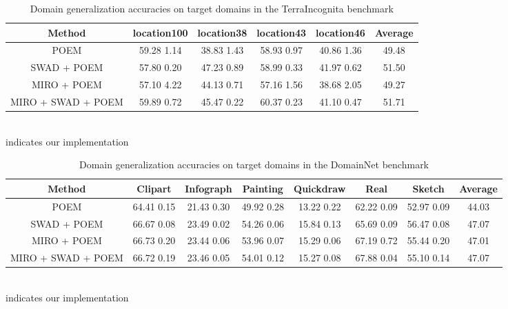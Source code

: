 \documentclass[letterpaper]{article} \usepackage{aaai23}  \usepackage{times}  \usepackage{helvet}  \usepackage{courier}  \usepackage[hyphens]{url}  \usepackage{graphicx} \urlstyle{rm} \def\UrlFont{\rm}  \usepackage{natbib}  \usepackage{caption} \frenchspacing  \setlength{\pdfpagewidth}{8.5in}  \setlength{\pdfpageheight}{11in}  \usepackage[labelsep=period]{caption}
\begin{document}
\begin{table}[H]
\centering
	\begin{tabular}{ccccc|c}
		\toprule
		\textbf{Method} & location100 & location38 & location43 & location46 & Average\\
		\midrule
		POEM & 59.28  1.14 & 38.83  1.43 & 58.93  0.97 & 40.86  1.36 & 49.48 \\
		SWAD + POEM & 57.80  0.20 & 47.23  0.89 & 58.99  0.33 & 41.97  0.62 & 51.50 \\
		MIRO + POEM& 57.10  4.22 & 44.13  0.71 & 57.16  1.56 & 38.68  2.05 & 49.27 \\
		MIRO + SWAD + POEM& 59.89  0.72 & 45.47  0.22 & 60.37  0.23 & 41.10  0.47 & 51.71 \\
		\hline
	\end{tabular}
	\label{tab:Terra_detail}
	\footnotesize{\\ indicates our implementation}\\
        \caption{Domain generalization accuracies on target domains in the TerraIncognita benchmark}
\end{table}	

\begin{table}[H]
\small
	\centering
	\begin{tabular}{ccccccc|c}
		\toprule
		\textbf{Method} & Clipart & Infograph & Painting & Quickdraw & Real & Sketch & Average\\
		\midrule
		POEM & 64.41  0.15 & 21.43  0.30 & 49.92  0.28 & 13.22  0.22 & 62.22  0.09 & 52.97  0.09 & 44.03 \\
		SWAD + POEM & 66.67  0.08 & 23.49  0.02 & 54.26  0.06 & 15.84  0.13 & 65.69  0.09 & 56.47  0.08 & 47.07 \\
		MIRO + POEM& 66.73  0.20 & 23.44  0.06 & 53.96  0.07 & 15.29  0.06 & 67.19  0.72 & 55.44  0.20 & 47.01 \\
		MIRO + SWAD + POEM& 66.72  0.19 & 23.46  0.05 & 54.01  0.12 & 15.27  0.08 & 67.88  0.04 & 55.10  0.14 & 47.07 \\
		\hline
	\end{tabular}
	\footnotesize{\\ indicates our implementation}\\
        \caption{Domain generalization accuracies on target domains in the DomainNet benchmark}
        \label{tab:DN_detail}
\end{table}	
\end{document}
